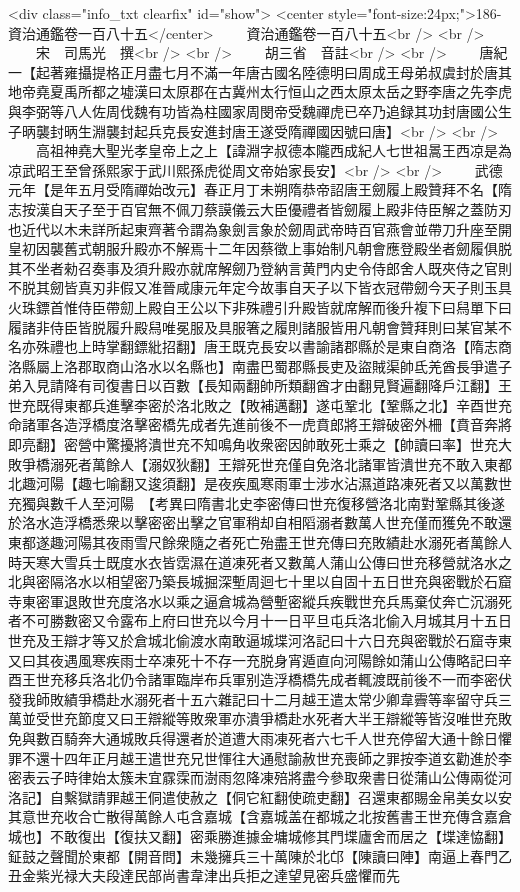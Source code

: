 <div class="info_txt clearfix" id="show">
<center style="font-size:24px;">186-資治通鑑卷一百八十五</center>
  　　資治通鑑卷一百八十五<br />
<br />
　　宋　司馬光　撰<br />
<br />
　　胡三省　音註<br />
<br />
　　唐紀一【起著雍攝提格正月盡七月不滿一年唐古國名陸德明曰周成王母弟叔虞封於唐其地帝堯夏禹所都之墟漢曰太原郡在古冀州太行恒山之西太原太岳之野李唐之先李虎與李弼等八人佐周伐魏有功皆為柱國家周閔帝受魏禪虎已卒乃追録其功封唐國公生子昞襲封昞生淵襲封起兵克長安進封唐王遂受隋禪國因號曰唐】<br />
<br />
　　高祖神堯大聖光孝皇帝上之上【諱淵字叔德本隴西成紀人七世祖暠王西凉是為凉武昭王至曾孫熙家于武川熙孫虎從周文帝始家長安】<br />
<br />
　　武德元年【是年五月受隋禪始改元】春正月丁未朔隋恭帝詔唐王劒履上殿贊拜不名【隋志按漢自天子至于百官無不佩刀蔡謨儀云大臣優禮者皆劒履上殿非侍臣解之蓋防刃也近代以木未詳所起東齊著令謂為象劍言象於劒周武帝時百官燕會並帶刀升座至開皇初因襲舊式朝服升殿亦不解焉十二年因蔡徵上事始制凡朝會應登殿坐者劒履俱脱其不坐者勑召奏事及須升殿亦就席解劒乃登納言黄門内史令侍郎舍人既夾侍之官則不脱其劒皆真刃非假又准晉咸康元年定今故事自天子以下皆衣冠帶劒今天子則玉具火珠鏢首惟侍臣帶劎上殿自王公以下非殊禮引升殿皆就席解而後升複下曰舄單下曰履諸非侍臣皆脱履升殿舄唯冕服及具服箸之履則諸服皆用凡朝會贊拜則曰某官某不名亦殊禮也上時掌翻鏢紕招翻】唐王既克長安以書諭諸郡縣於是東自商洛【隋志商洛縣屬上洛郡取商山洛水以名縣也】南盡巴蜀郡縣長吏及盜賊渠帥氐羌酋長爭遣子弟入見請降有司復書日以百數【長知兩翻帥所類翻酋才由翻見賢遍翻降戶江翻】王世充既得東都兵進擊李密於洛北敗之【敗補邁翻】遂屯鞏北【鞏縣之北】辛酉世充命諸軍各造浮橋度洛擊密橋先成者先進前後不一虎賁郎將王辯破密外柵【賁音奔將即亮翻】密營中驚擾將潰世充不知鳴角收衆密因帥敢死士乘之【帥讀曰率】世充大敗爭橋溺死者萬餘人【溺奴狄翻】王辯死世充僅自免洛北諸軍皆潰世充不敢入東都北趣河陽【趣七喻翻又逡須翻】是夜疾風寒雨軍士涉水沾濕道路凍死者又以萬數世充獨與數千人至河陽　【考異曰隋書北史李密傳曰世充復移營洛北南對鞏縣其後遂於洛水造浮橋悉衆以擊密密出擊之官軍稍却自相䧟溺者數萬人世充僅而獲免不敢還東都遂趣河陽其夜雨雪尺餘衆隨之者死亡殆盡王世充傳曰充敗績赴水溺死者萬餘人時天寒大雪兵士既度水衣皆霑濕在道凍死者又數萬人蒲山公傳曰世充移營就洛水之北與密隔洛水以相望密乃築長城掘深塹周迴七十里以自固十五日世充與密戰於石窟寺東密軍退敗世充度洛水以乘之逼倉城為營塹密縱兵疾戰世充兵馬棄仗奔亡沉溺死者不可勝數密又令露布上府曰世充以今月十一日平旦屯兵洛北偷入月城其月十五日世充及王辯才等又於倉城北偷渡水南敢逼城堞河洛記曰十六日充與密戰於石窟寺東又曰其夜遇風寒疾雨士卒凍死十不存一充脱身宵遁直向河陽餘如蒲山公傳略記曰辛酉王世充移兵洛北仍令諸軍臨岸布兵軍别造浮橋橋先成者輒渡既前後不一而李密伏發我師敗績爭橋赴水溺死者十五六雜記曰十二月越王遣太常少卿韋霽等率留守兵三萬並受世充節度又曰王辯縱等敗衆軍亦潰爭橋赴水死者大半王辯縱等皆沒唯世充敗免與數百騎奔大通城敗兵得還者於道遭大雨凍死者六七千人世充停留大通十餘日懼罪不還十四年正月越王遣世充兄世惲往大通慰諭赦世充喪師之罪按李道玄勸進於李密表云子時律始太簇未宜霡霂而澍雨忽降凍殕將盡今參取衆書日從蒲山公傳兩從河洛記】自繫獄請罪越王侗遣使赦之【侗它紅翻使疏吏翻】召還東都賜金帛美女以安其意世充收合亡散得萬餘人屯含嘉城【含嘉城盖在都城之北按舊書王世充傳含嘉倉城也】不敢復出【復扶又翻】密乘勝進據金墉城修其門堞廬舍而居之【堞達恊翻】鉦鼓之聲聞於東都【開音問】未幾擁兵三十萬陳於北邙【陳讀曰陣】南逼上春門乙丑金紫光禄大夫段達民部尚書韋津出兵拒之達望見密兵盛懼而先